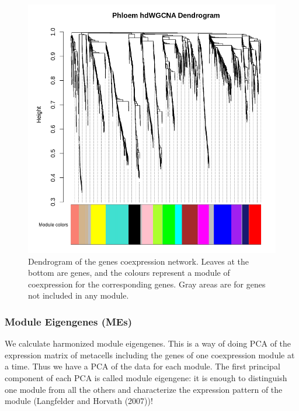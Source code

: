 \documentclass[
  letterpaper,
  DIV=11,
  numbers=noendperiod]{scrartcl}
\begin{document}
\begin{figure}[H]

{\centering \includegraphics{notebook_files/figure-pdf/fig-dendro-output-1.png}

}

\caption{\label{fig-dendro}Dendrogram of the genes coexpression network.
Leaves at the bottom are genes, and the colours represent a module of
coexpression for the corresponding genes. Gray areas are for genes not
included in any module.}

\end{figure}

\hypertarget{module-eigengenes-mes}{%
\subsubsection{Module Eigengenes (MEs)}\label{module-eigengenes-mes}}

We calculate harmonized module eigengenes. This is a way of doing PCA of
the expression matrix of metacells including the genes of one
coexpression module at a time. Thus we have a PCA of the data for each
module. The first principal component of each PCA is called module
eigengene: it is enough to distinguish one module from all the others
and characterize the expression pattern of the module (Langfelder and
Horvath (2007))!
\end{document}
